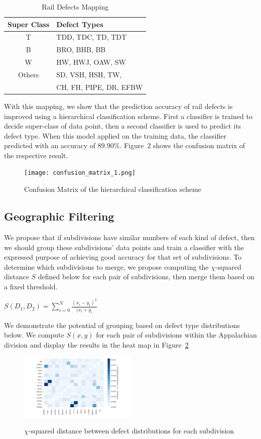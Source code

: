 \documentclass{sig-alternate-05-2015}
\begin{document}
\begin{table}
\label{defect_groups}
\centering
\caption{Rail Defects Mapping}
\begin{tabular}{|c|l|} \hline
Super Class & Defect Types\\ \hline
T & TDD, TDC, TD, TDT\\ \hline
B & BRO, BHB, BB\\ \hline
W & HW, HWJ, OAW, SW\\ \hline
Others & SD, VSH, HSH, TW,\\
  & CH, FH, PIPE, DR, EFBW\\
\hline\end{tabular}
\end{table}

With this mapping, we show that the prediction accuracy of rail defects is improved using a hierarchical classification scheme. First a classifier is trained to decide super-class of data point, then a second classifier is used to predict its defect type. When this model applied on the training data, the classifier predicted with an accuracy of $89.90\%$. Figure~2 shows the confusion matrix of the respective result.

\begin{figure}[ht!]
\texttt{[image: confusion\_matrix\_1.png]}
\label{confusion_matrix_2}
\caption{Confusion Matrix of the hierarchical classification scheme}
\end{figure}


\subsection{Geographic Filtering}
We propose that if subdivisions have similar numbers of each kind of defect, then we should
group these subdivisions' data points and train a classifier with the expressed purpose of 
achieving good accuracy for that set of subdivisions. To determine which subdivisions to merge,
we propose computing the $\chi$-squared distance $S$ defined below for each pair of 
subdivisions, then merge them based on a fixed threshold. 
\begin{center}
    $S(D_1,D_2) = \sum\limits_{i=0}^{N}\frac{(x_i - y_i)^2}{(x_i + y_i}$
\end{center}
We demonstrate the potential of grouping based on defect type distributions below. We compute
$S(x,y)$ for each pair of subdivisions within the Appalachian division and display the results
in the heat map in Figure~\ref{similarity_heatmap}
\begin{figure}[ht!]
\includegraphics[width=0.5\textwidth]{similarity_heatmap.pdf}
\label{similarity_heatmap}
\caption{$\chi$-squared distance between defect distributions for each subdivision}
\end{figure}
\end{document}
